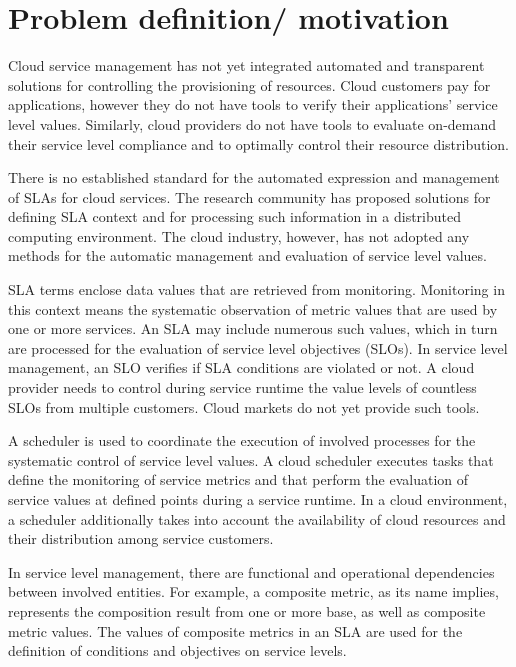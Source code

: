 \section{Problem definition/ motivation}
\label{sec:problem}
Cloud service management has not yet integrated automated and transparent solutions for controlling the provisioning of resources. Cloud customers pay for applications, however they do not have tools to verify their applications' service level values. Similarly, cloud providers do not have tools to evaluate on-demand their service level compliance and to optimally control their resource distribution.

There is no established standard for the automated expression and management of SLAs for cloud services. The research community has proposed solutions for defining SLA context \cite{wsla, wsag} and for processing such information \cite{lisa, lessons} in a distributed computing environment. The cloud industry, however, has not adopted any methods for the automatic management and evaluation of service level values.

SLA terms enclose data values that are retrieved from monitoring. Monitoring in this context means the systematic observation of metric values that are used by one or more services. An SLA may include numerous such values, which in turn are processed for the evaluation of service level objectives (SLOs). In service level management, an SLO verifies if SLA conditions are violated or not. A cloud provider needs to control during service runtime the value levels of countless SLOs from multiple customers. Cloud markets do not yet provide such tools.

A scheduler is used to coordinate the execution of involved processes for the systematic control of service level values. A cloud scheduler executes tasks that define the monitoring of service metrics and that perform the evaluation of service values at defined points during a service runtime. In a cloud environment, a scheduler additionally takes into account the availability of cloud resources and their distribution among service customers. 
 
In service level management, there are functional and operational dependencies between involved entities. For example, a composite metric, as its name implies, represents the composition result from one or more base, as well as composite metric values. The values of composite metrics in an SLA are used for the definition of conditions and objectives on service levels. 

